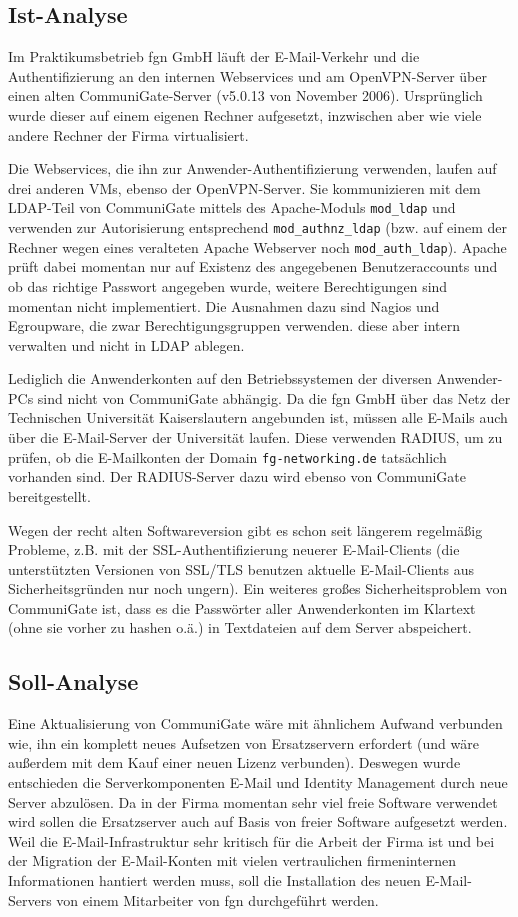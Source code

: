 \documentclass[11pt,a4paper,titlepage=firstiscover,headsepline]{scrartcl} %
\begin{document}
\subsection{Ist-Analyse}
Im Praktikumsbetrieb fgn GmbH läuft der E-Mail-Verkehr und die Authentifizierung an den internen Webservices und am OpenVPN-Server über einen alten CommuniGate-Server (v5.0.13 von November 2006). Ursprünglich wurde dieser auf einem eigenen Rechner aufgesetzt, inzwischen aber wie viele andere Rechner der Firma virtualisiert. 

Die Webservices, die ihn zur Anwender-Authentifizierung verwenden, laufen auf drei anderen VMs, ebenso der OpenVPN-Server. Sie kommunizieren mit dem LDAP-Teil von CommuniGate mittels des Apache-Moduls \texttt{mod\_ldap} und verwenden zur Autorisierung entsprechend \texttt{mod\_authnz\_ldap} (bzw. auf einem der Rechner wegen eines veralteten Apache Webserver noch \texttt{mod\_auth\_ldap}). Apache prüft dabei momentan nur auf Existenz des angegebenen Benutzeraccounts und ob das richtige Passwort angegeben wurde, weitere Berechtigungen sind momentan nicht implementiert. Die Ausnahmen dazu sind Nagios und Egroupware, die zwar Berechtigungsgruppen verwenden. diese aber intern verwalten und nicht in LDAP ablegen.

Lediglich die Anwenderkonten auf den Betriebssystemen der diversen Anwender-PCs sind nicht von CommuniGate abhängig. Da die fgn GmbH über das Netz der Technischen Universität Kaiserslautern angebunden ist, müssen alle E-Mails auch über die E-Mail-Server der Universität laufen. Diese verwenden RADIUS, um zu prüfen, ob die E-Mailkonten der Domain \texttt{fg-networking.de} tatsächlich vorhanden sind. Der RADIUS-Server dazu wird ebenso von CommuniGate bereitgestellt. 

Wegen der recht alten Softwareversion gibt es schon seit längerem regelmäßig Probleme, z.B. mit der SSL-Authentifizierung neuerer E-Mail-Clients (die unterstützten Versionen von SSL/TLS benutzen aktuelle E-Mail-Clients aus Sicherheitsgründen nur noch ungern). Ein weiteres großes Sicherheitsproblem von CommuniGate ist, dass es die Passwörter aller Anwenderkonten im Klartext (ohne sie vorher zu hashen o.ä.) in Textdateien auf dem Server abspeichert.

\subsection{Soll-Analyse}
Eine Aktualisierung von CommuniGate wäre mit ähnlichem Aufwand verbunden wie, ihn ein komplett neues Aufsetzen von Ersatzservern erfordert (und wäre außerdem mit dem Kauf einer neuen Lizenz verbunden). Deswegen wurde entschieden die Serverkomponenten E-Mail und Identity Management durch neue Server abzulösen. Da in der Firma momentan sehr viel freie Software verwendet wird sollen die Ersatzserver auch auf Basis von freier Software aufgesetzt werden. Weil die E-Mail-Infrastruktur sehr kritisch für die Arbeit der Firma ist und bei der Migration der E-Mail-Konten mit vielen vertraulichen firmeninternen Informationen hantiert werden muss, soll die Installation des neuen E-Mail-Servers von einem Mitarbeiter von fgn durchgeführt werden.
\end{document}
